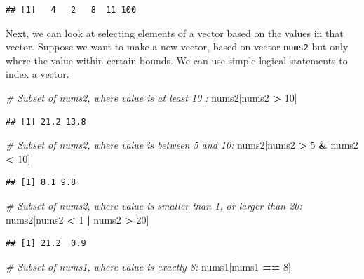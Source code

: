 \documentclass[]{book}
\newenvironment{Shaded}{\begin{snugshade}}{\end{snugshade}}
\newcommand{\CommentTok}[1]{\textcolor[rgb]{0.56,0.35,0.01}{\textit{#1}}}
\newcommand{\DecValTok}[1]{\textcolor[rgb]{0.00,0.00,0.81}{#1}}
\newcommand{\NormalTok}[1]{#1}
\newcommand{\OperatorTok}[1]{\textcolor[rgb]{0.81,0.36,0.00}{\textbf{#1}}}
\newcommand{\StringTok}[1]{\textcolor[rgb]{0.31,0.60,0.02}{#1}}
\begin{document}
\begin{verbatim}
## [1]   4   2   8  11 100
\end{verbatim}

Next, we can look at selecting elements of a vector based on the values in that vector. Suppose we want to make a new vector, based on vector \texttt{nums2} but only where the value within certain bounds. We can use simple logical statements to index a vector.

\begin{Shaded}
\begin{Highlighting}[]
\CommentTok{# Subset of nums2, where value is at least 10 :}
\NormalTok{nums2[nums2 }\OperatorTok{>}\StringTok{ }\DecValTok{10}\NormalTok{]}
\end{Highlighting}
\end{Shaded}

\begin{verbatim}
## [1] 21.2 13.8
\end{verbatim}

\begin{Shaded}
\begin{Highlighting}[]
\CommentTok{# Subset of nums2, where value is between 5 and 10:}
\NormalTok{nums2[nums2 }\OperatorTok{>}\StringTok{ }\DecValTok{5} \OperatorTok{&}\StringTok{ }\NormalTok{nums2 }\OperatorTok{<}\StringTok{ }\DecValTok{10}\NormalTok{]}
\end{Highlighting}
\end{Shaded}

\begin{verbatim}
## [1] 8.1 9.8
\end{verbatim}

\begin{Shaded}
\begin{Highlighting}[]
\CommentTok{# Subset of nums2, where value is smaller than 1, or larger than 20:}
\NormalTok{nums2[nums2 }\OperatorTok{<}\StringTok{ }\DecValTok{1} \OperatorTok{|}\StringTok{ }\NormalTok{nums2 }\OperatorTok{>}\StringTok{ }\DecValTok{20}\NormalTok{]}
\end{Highlighting}
\end{Shaded}

\begin{verbatim}
## [1] 21.2  0.9
\end{verbatim}

\begin{Shaded}
\begin{Highlighting}[]
\CommentTok{# Subset of nums1, where value is exactly 8:}
\NormalTok{nums1[nums1 }\OperatorTok{==}\StringTok{ }\DecValTok{8}\NormalTok{]}
\end{Highlighting}
\end{Shaded}
\end{document}
